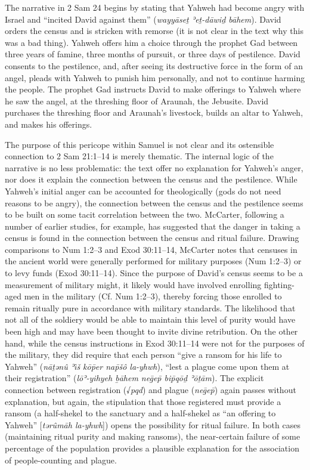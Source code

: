 The narrative in 2 Sam 24 begins by stating that Yahweh had become angry
with Israel and ``incited David against them'' (\emph{wayyāseṯ ʾeṯ-dāwiḏ
bāhem}). David orders the census and is stricken with remorse (it is not
clear in the text why this was a bad thing). Yahweh offers him a choice
through the prophet Gad between three years of famine, three months of
pursuit, or three days of pestilence. David consents to the pestilence,
and, after seeing its destructive force in the form of an angel, pleads
with Yahweh to punish him personally, and not to continue harming the
people. The prophet Gad instructs David to make offerings to Yahweh
where he saw the angel, at the threshing floor of Araunah, the Jebusite.
David purchases the threshing floor and Araunah's livestock, builds an
altar to Yahweh, and makes his offerings.

The purpose of this pericope within Samuel is not clear and its
ostensible connection to 2 Sam 21:1--14 is merely
thematic.\autocite[509]{mccarter1984} The internal logic of the
narrative is no less problematic: the text offer no explanation for
Yahweh's anger, nor does it explain the connection between the census
and the pestilence. While Yahweh's initial anger can be accounted for
theologically (gods do not need reasons to be angry), the connection
between the census and the pestilence seems to be built on some tacit
correlation between the two. McCarter, following a number of earlier
studies, for example, has suggested that the danger in taking a census
is found in the connection between the census and ritual failure.
Drawing comparisons to Num 1:2--3 and Exod 30:11--14, McCarter notes
that censuses in the ancient world were generally performed for military
purposes (Num 1:2--3) or to levy funds (Exod 30:11--14). Since the
purpose of David's census seems to be a measurement of military might,
it likely would have involved enrolling fighting-aged men in the
military (Cf. Num 1:2--3), thereby forcing those enrolled to remain
ritually pure in accordance with military standards. The likelihood that
not all of the soldiery would be able to maintain this level of purity
would have been high and may have been thought to invite divine
retribution. On the other hand, while the census instructions in Exod
30:11--14 were not for the purposes of the military, they did require
that each person ``give a ransom for his life to Yahweh'' (\emph{nāṯənû
ʾı̂š kōp̄er nap̄šô la-yhwh}), ``lest a plague come upon them at their
registration'' (\emph{lōʾ-yihyeh ḇāhem neḡep̄ bip̄qōḏ ʾōṯām}). The
explicit connection between registration (√\emph{pqd}) and plague
(\emph{neḡep̄}) again passes without explanation, but again, the
stipulation that those registered must provide a ransom (a half-shekel
to the sanctuary and a half-shekel as ``an offering to Yahweh''
{[}\emph{tərûmāh la-yhwh}{]}) opens the possibility for ritual failure.
In both cases (maintaining ritual purity and making ransoms), the
near-certain failure of some percentage of the population provides a
plausible explanation for the association of people-counting and plague.

